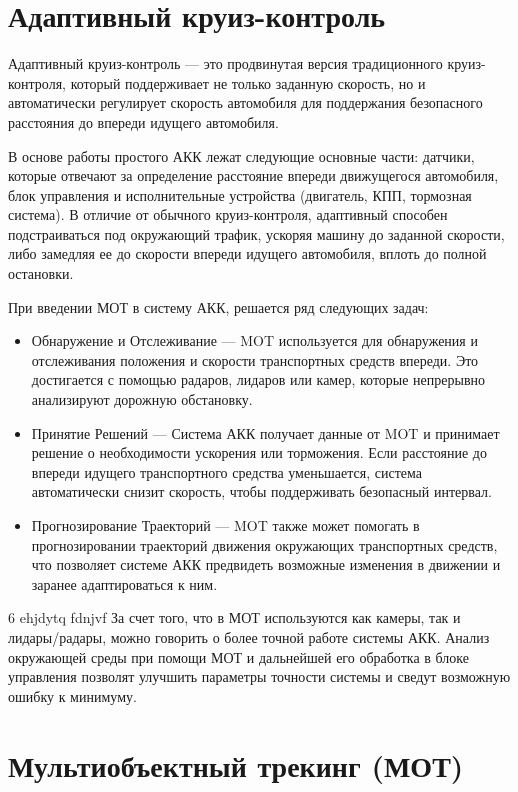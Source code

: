 \chapter{Адаптивный круиз-контроль}
Адаптивный круиз-контроль --- это продвинутая версия традиционного круиз-контроля, который поддерживает не только заданную скорость, но и автоматически регулирует скорость автомобиля для поддержания безопасного расстояния до впереди идущего автомобиля.

В основе работы простого АКК лежат следующие основные части: датчики, которые отвечают за определение расстояние впереди движущегося автомобиля, блок управления и исполнительные устройства (двигатель, КПП, тормозная система). В отличие от обычного круиз-контроля, адаптивный способен подстраиваться под окружающий трафик, ускоряя машину до заданной скорости, либо замедляя ее до скорости впереди идущего автомобиля, вплоть до полной остановки.

При введении МОТ в систему АКК, решается ряд следующих задач:

\begin{itemize}

	\item Обнаружение и Отслеживание --- MOT используется для обнаружения и отслеживания положения и скорости транспортных средств впереди. Это достигается с помощью радаров, лидаров или камер, которые непрерывно анализируют дорожную обстановку.

	\item Принятие Решений --- Система АКК получает данные от MOT и принимает решение о необходимости ускорения или торможения. Если расстояние до впереди идущего транспортного средства уменьшается, система автоматически снизит скорость, чтобы поддерживать безопасный интервал.

	\item Прогнозирование Траекторий --- MOT также может помогать в прогнозировании траекторий движения окружающих транспортных средств, что позволяет системе АКК предвидеть возможные изменения в движении и заранее адаптироваться к ним.

\end{itemize}6 ehjdytq fdnjvf
За счет того, что в МОТ используются как камеры, так и лидары/радары, можно говорить о более точной работе системы АКК. Анализ окружающей среды при помощи МОТ и дальнейшей его обработка в блоке управления позволят улучшить параметры точности системы и сведут возможную ошибку к минимуму.  

\chapter{Мультиобъектный трекинг (МОТ)}


